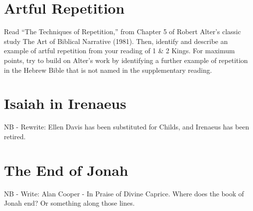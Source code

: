 \documentclass[12pt]{article}
\begin{document}
\section{Artful Repetition}

Read “The Techniques of Repetition,” from Chapter 5 of Robert Alter’s classic study The Art of Biblical Narrative (1981). Then, identify and describe an example of artful repetition from your reading of 1 \& 2 Kings. For maximum points, try to build on Alter’s work by identifying a further example of repetition in the Hebrew Bible that is not named in the supplementary reading.


\section{Isaiah in Irenaeus}

NB - Rewrite: Ellen Davis has been substituted for Childs, and Irenaeus has been retired.



\section{The End of Jonah}

NB - Write: Alan Cooper - In Praise of Divine Caprice. Where does the book of Jonah end? Or something along those lines.

%
\end{document}
